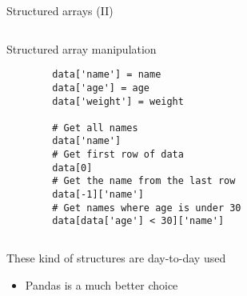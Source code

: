 \documentclass[10pt,compress]{beamer} %
\begin{document}
\begin{frame}[fragile]{Structured arrays (II)}
	\begin{columns}
	\begin{exampleblock}{\footnotesize{Structured array manipulation}}
		\vspace{-0.2cm} 
		\begin{lstlisting}
		data['name'] = name
		data['age'] = age
		data['weight'] = weight

		# Get all names
		data['name']
		# Get first row of data
		data[0]
		# Get the name from the last row
		data[-1]['name']
		# Get names where age is under 30
		data[data['age'] < 30]['name']
		\end{lstlisting}
		\vspace{-0.2cm} 
	\end{exampleblock}

	\bigskip

	\end{columns}
	These kind of structures are day-to-day used
	\begin{itemize}
		\item Pandas is a much better choice
	\end{itemize}
\end{frame}
\end{document}
